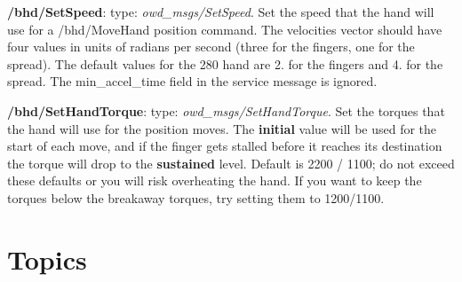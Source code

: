 \begin{DoxyItemize}
\item {\bfseries /bhd/\-Set\-Speed}\-: type\-: {\itshape owd\-\_\-msgs/\-Set\-Speed}. Set the speed that the hand will use for a /bhd/\-Move\-Hand position command. The velocities vector should have four values in units of radians per second (three for the fingers, one for the spread). The default values for the 280 hand are 2. for the fingers and 4. for the spread. The min\-\_\-accel\-\_\-time field in the service message is ignored.
\item {\bfseries /bhd/\-Set\-Hand\-Torque}\-: type\-: {\itshape owd\-\_\-msgs/\-Set\-Hand\-Torque}. Set the torques that the hand will use for the position moves. The {\bfseries initial} value will be used for the start of each move, and if the finger gets stalled before it reaches its destination the torque will drop to the {\bfseries sustained} level. Default is 2200 / 1100; do not exceed these defaults or you will risk overheating the hand. If you want to keep the torques below the breakaway torques, try setting them to 1200/1100.
\end{DoxyItemize}\hypertarget{bhand_topics}{}\section{Topics}\label{bhand_topics}

